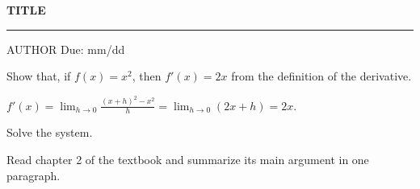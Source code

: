 \documentclass[11pt,a4paper]{exam}
\begin{document}
{\Large\bfseries {{TITLE}}}\par
{\color{tocaHoney}\rule{2.5cm}{2pt}}\par\smallskip
{\small {{AUTHOR}} \textbullet{} Due: mm/dd}

\vspace{1em}
\begin{questions}

\question Show that, if $f(x) = x^2$, then $f'(x) = 2x$ from the definition of the derivative.
\begin{solution}
  $f'(x) = \lim_{h\to 0} \frac{(x+h)^2 - x^2}{h} = \lim_{h \to 0} (2x + h) = 2x$.
\end{solution}

\question Solve the system.

\question Read chapter 2 of the textbook and summarize its main argument in one paragraph.
\fillwithlines{4cm}

\end{questions}
\end{document}
